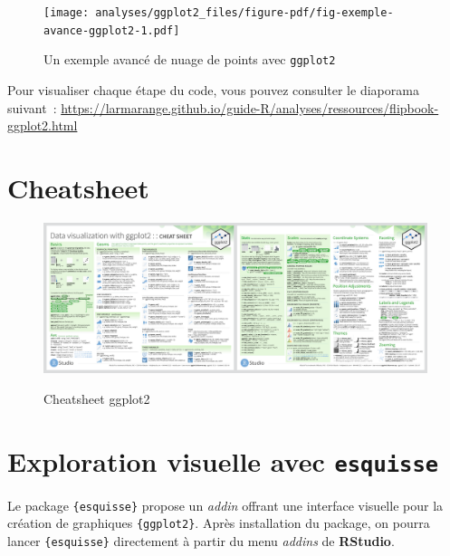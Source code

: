\documentclass[
  letterpaper,
  DIV=11,
  numbers=noendperiod,
  oneside]{scrreprt}
\begin{document}
\begin{figure}[H]

{\centering \texttt{[image: analyses/ggplot2\_files/figure-pdf/fig-exemple-avance-ggplot2-1.pdf]}

}

\caption{\label{fig-exemple-avance-ggplot2}Un exemple avancé de nuage de
points avec \texttt{ggplot2}}

\end{figure}

Pour visualiser chaque étape du code, vous pouvez consulter le diaporama
suivant~:
\url{https://larmarange.github.io/guide-R/analyses/ressources/flipbook-ggplot2.html}

\hypertarget{sec-cheatsheet-ggplot2}{%
\section{Cheatsheet}\label{sec-cheatsheet-ggplot2}}

\begin{figure}

{\centering 

\href{https://github.com/rstudio/cheatsheets/raw/main/data-visualization-2.1.pdf}{\includegraphics{analyses/ressources/data-visualization-cheatsheet-thumbs.png}}

}

\caption{\label{fig-cheatsheet-ggplot2}Cheatsheet ggplot2}

\end{figure}

\hypertarget{sec-esquisse}{%
\section{\texorpdfstring{Exploration visuelle avec
\texttt{esquisse}}{Exploration visuelle avec esquisse}}\label{sec-esquisse}}

Le package \texttt{\{esquisse\}} propose un \emph{addin} offrant une
interface visuelle pour la création de graphiques \texttt{\{ggplot2\}}.
Après installation du package, on pourra lancer \texttt{\{esquisse\}}
directement à partir du menu \emph{addins} de \textbf{RStudio}.
\end{document}
